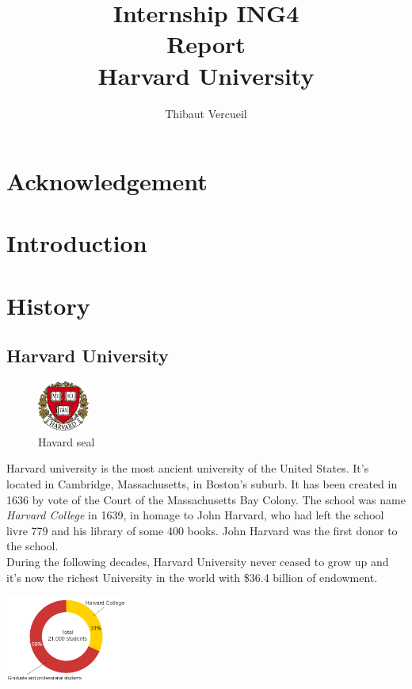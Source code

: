 \documentclass[12pt,a4paper]{article}
\title{{\Huge Internship ING4}\\ Report\\ \vspace{1cm} Harvard University}
\author{Thibaut Vercueil}
\begin{document}
\maketitle
\newpage
\tableofcontents
\newpage
\section{Acknowledgement}

\section{Introduction}

\section{History}

\subsection{Harvard University}


\begin{figure}
\centering
\includegraphics[width=0.15\textwidth]{harvardlogo.png}
\caption*{Havard seal}
\end{figure}
Harvard university is the most ancient university of the United States. It's located in Cambridge, Massachusetts, in Boston's suburb. It has been created in 1636 by vote of the Court of the Massachusetts Bay Colony. The school was name \textit{Harvard College} in 1639, in homage to John Harvard, who had left the school livre 779 and his library of some 400 books. John Harvard was the first donor to the school.\\
During the following decades, Harvard University never ceased to grow up and it's now the richest University in the world with \$36.4 billion of endowment.


\includegraphics[width=0.3\textwidth]{images/fig1.png}
\end{document}
